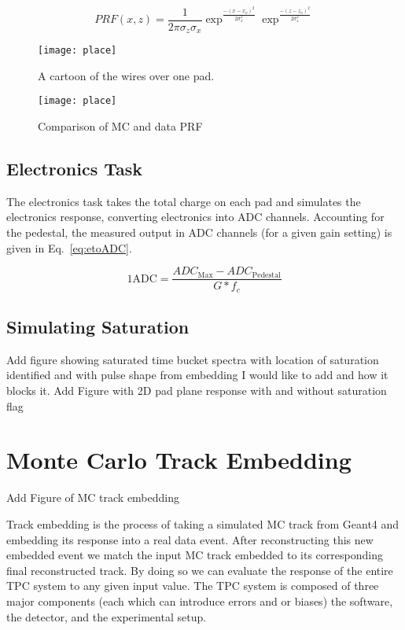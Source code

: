 \begin{equation}
PRF(x,z) = \frac{1}{2\pi\sigma_z\sigma_x}\exp^{\frac{-{(x-x_o)}^2}{2\sigma_x^2}}\exp^{\frac{-{(z-z_o)}^2}{2\sigma_z^2}}
\label{eq:softPRF}
\end{equation}

\begin{figure}
\texttt{[image: place]}
\caption{A cartoon of the wires over one pad. }
\label{fig:onepad}
\end{figure}

\begin{figure}
\texttt{[image: place]}
\caption{Comparison of MC and data PRF}
\label{fig:mcdataPRF}
\end{figure}

\subsection{Electronics Task}
The electronics task takes the total charge on each pad and simulates the electronics response, converting electronics into ADC channels. Accounting for the pedestal, the measured output in ADC channels (for a given gain setting) is given in Eq.~\ref{eq:etoADC}.

\begin{equation}
\mathrm{1 ADC }= \frac{ADC_{\mathrm{Max}} - ADC_{\mathrm{Pedestal}}}{G*f_c}
\label{eq:etoADC}
\end{equation}

\subsection{Simulating Saturation}
Add figure showing saturated time bucket spectra with location of saturation identified and with pulse shape from embedding I would like to add and how it blocks it.
Add Figure with 2D pad plane response with and without saturation flag


\section{Monte Carlo Track Embedding}
Add Figure of MC track embedding 



Track embedding is the process of taking a simulated MC track from Geant4 and embedding its response into a real data event. After reconstructing this new embedded event we match the input MC track embedded to its corresponding final reconstructed track.  By doing so we can evaluate the response of the entire TPC system to any given input value. The TPC system is composed of three major components (each which can introduce errors and or biases) the software, the detector, and the experimental setup.  

